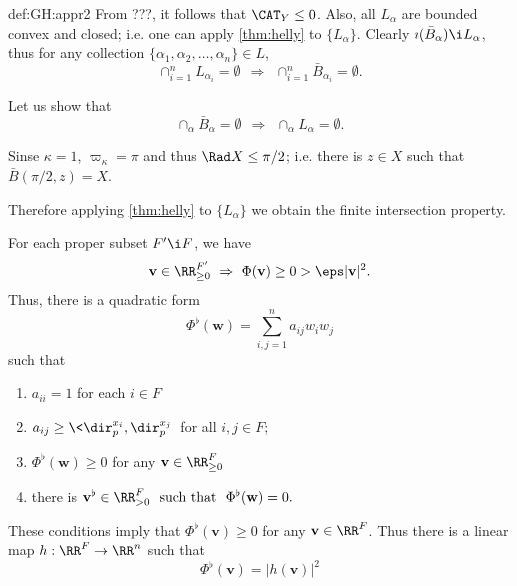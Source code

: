 {\begin{subthm}{def:GH:appr2}
From ???, it follows that $\CAT_Y\le 0$.
Also, all $L_\alpha$ are bounded convex and closed;
i.e. one can apply \ref{thm:helly} to $\{L_\alpha\}$.
Clearly $\imath(\bar B_\alpha)\i L_\alpha$, thus for any collection
$\{\alpha_1,\alpha_2,\dots,\alpha_n\}\in L$,
$$\cap_{i=1}^n L_{\alpha_i}=\emptyset 
\ \ 
\Longrightarrow
\ \ 
\cap_{i=1}^n \bar B_{\alpha_i}=\emptyset.$$

Let us show that 
$$\cap_\alpha \bar B_\alpha=\emptyset 
\ \ 
\Longrightarrow
\ \ 
\cap_\alpha L_\alpha=\emptyset.$$

Sinse $\kappa=1$, $\varpi_\kappa=\pi$ and thus $\Rad X\le\pi/2$; 
i.e. there is $z\in X$ such that $\bar B(\pi/2,z)=X$. 


Therefore applying \ref{thm:helly} to $\{L_\alpha\}$ we obtain 
the finite intersection property.























For each proper subset $F'\i F$, we have 
$$\mathbf v\in \RR_{\ge0}^{F'}\ \Rightarrow\ \Phi(\mathbf v)\ge0
>\eps|\mathbf v|^2.$$
Thus, there is a quadratic form 
$$\Phi^\flat(\mathbf w)=\sum_{i,j=1}^n a_{ij}w_iw_j$$ such that 
\begin{enumerate}
\item $a_{ii}=1$ for each $i\in F$
\item $a_{ij}\ge \<\dir_p^{x_i},\dir_p^{x_j}\>$ for all $i,j\in F$;
\item $\Phi^\flat(\mathbf w)\ge 0$ for any $\mathbf v\in\RR_{\ge0}^{F}$
\item there is $\mathbf v^\flat\in\RR_{>0}^{F}\ \ \text{such that}\ \ \Phi^\flat(\mathbf w)= 0.$
\end{enumerate}

These conditions imply that $\Phi^\flat(\mathbf v)\ge 0$ for any $\mathbf v\in\RR^{F}$.
Thus there is a linear map $h:\RR^F\to \RR^n$ such that
$$\Phi^\flat(\mathbf v)=|h(\mathbf v)|^2$$














\end{subthm}}
